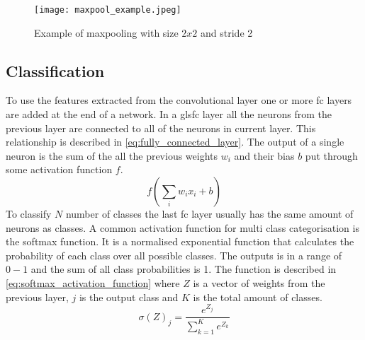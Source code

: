 \begin{figure}[h]
\centering
\texttt{[image: maxpool\_example.jpeg]}
\caption{Example of maxpooling with size $2x2$ and stride 2 \citep{Karpathy2016a}}
\label{fig:maxpool_example}
\end{figure}
\subsection{Classification}
To use the features extracted from the convolutional layer one or more \gls{fc} layers are added at the end of a network. In a gls{fc} layer all the neurons from the previous layer are connected to all of the neurons in current layer. This relationship is described in \autoref{eq:fully_connected_layer}. The output of a single neuron is the sum of the all the previous weights $w_i$ and their bias $b$ put through some activation function $f$.
\begin{equation}
\label{eq:fully_connected_layer}
f\left(\sum_{i}w_{i}x_{i}+b\right)
\end{equation}
To classify $N$ number of classes the last \gls{fc} layer usually has the same amount of neurons as classes. A common activation function for multi class categorisation is the softmax function. It is a normalised exponential function that calculates the probability of each class over all possible classes. The outputs is in a range of $0 - 1$ and the sum of all class probabilities is 1. The function is described in \autoref{eq:softmax_activation_function} where $Z$ is a vector of weights from the previous layer, $j$ is the output class and $K$ is the total amount of classes.
\begin{equation}
\label{eq:softmax_activation_function}
\sigma(Z)_{j} = \frac{e^{Z_j}}{\sum_{k=1}^{K}e^{Z_k}}
\end{equation}

